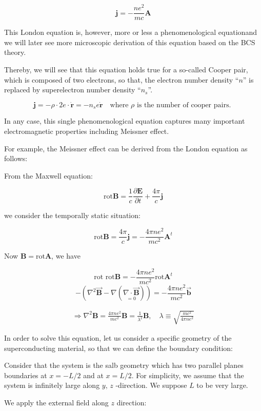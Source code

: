 ﻿\documentclass[twoside]{book}
\numberwithin{equation}{section}
\begin{document}
\[\bm{j} = -\frac{ne^2}{mc}\bm{A} \]

This London equation is, however, more or less a phenomenological equationand we will later see more microscopic derivation of this equation based on the BCS theory. 

Thereby, we will see that this equation holds true for a so-called Cooper pair, which is composed of two electrons, so that, the electron number density ``$n$'' is replaced by superelectron number density ``$n_s$''. 

\[\bm{j} = -\rho\cdot 2e \cdot\dot{\bm{r}} = -n_s e \dot{\bm{r}}\quad \text{where $\rho$ is the number of cooper pairs. } \]

In any case, this single phenomenological equation captures many important electromagnetic properties including Meissner effect. 

For example, the Meissner effect can be derived from the London equation as follows: 

From the Maxwell equation: 

\[\text{rot} \bm{B} = \frac{1}{c}\frac{\partial \bm{E}}{\partial t} + \frac{4\pi}{c}\bm{j} \]

we consider the temporally static situation: 

\[\text{rot}\bm{B} = \frac{4\pi}{c}\bm{j} = -\frac{4\pi ne^2}{mc^2}\bm{A}^t \]

Now $\bm{B} = \text{rot}\bm{A}$, we have

\[\text{rot\ rot}\bm{B} = -\frac{4\pi ne^2}{mc^2}\text{rot}\bm{A}^t \]
\[-\left(\nabla^2\vec{\bm{B}} - \nabla (\underset{=0}{\nabla \cdot \vec{\bm{B}}})\right) = -\frac{4\pi ne^2}{mc^2}\vec{\bm{b}} \]

\begin{align} \tag{A}
\Rightarrow \nabla^2 \bm{B} = \frac{4\pi ne^2}{mc^2}\bm{B} = \frac{1}{\lambda^2}\bm{B},\quad \lambda \equiv \sqrt{\frac{mc^2}{4\pi ne^2}} 
\end{align}

In order to solve this equation, let us consider a specific geometry of the superconducting material, so that we can define the boundary condition: 

Consider that the system is the salb geometry which has two parallel planes boundaries at $x = -L/2$ and at $x = L/2$. For simplicity, we assume that the system is infinitely large along $y,\, z$ -direction. We suppose $L$ to be very large. 

We apply the external field along $z$ direction: 
\end{document}
